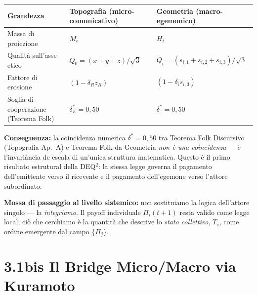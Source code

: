 {\def\LTcaptype{none} %
{\small\begin{longtable}[]{@{}
  >{\raggedright\arraybackslash}p{}
  >{\raggedright\arraybackslash}p{}
  >{\raggedright\arraybackslash}p{}@{}}
\toprule\noalign{}
\begin{minipage}[b]{\linewidth}\raggedright
Grandezza
\end{minipage} & \begin{minipage}[b]{\linewidth}\raggedright
Topografia (micro-comunicativo)
\end{minipage} & \begin{minipage}[b]{\linewidth}\raggedright
Geometria (macro-egemonico)
\end{minipage} \\
\midrule\noalign{}
\endhead
\bottomrule\noalign{}
\endlastfoot
Massa di proiezione & \(M_e\) & \(H_i\) \\
Qualità sull'asse etico & \(Q_0 = (x+y+z)/\sqrt{3}\) &
\(Q_i = (s_{i,1}+s_{i,2}+s_{i,3})/\sqrt{3}\) \\
Fattore di erosione & \((1 - \delta_R z_R)\) &
\((1 - \delta_i s_{i,3})\) \\
Soglia di cooperazione (Teorema Folk) & \(\delta^*_E = 0{,}50\) &
\(\delta^* = 0{,}50\) \\
\end{longtable}}
}

\Proved{} \textbf{Conseguenza:} la coincidenza numerica
\(\delta^* = 0{,}50\) tra Teorema Folk Discursivo (Topografia Ap.~A) e
Teorema Folk da Geometria \emph{non è una coincidenza} --- è
l'invariância de escala di un'unica struttura matematica. Questo è il
primo risultato estrutural della DEQ$^2$: la stessa legge governa il
pagamento dell'emittente verso il ricevente e il pagamento dell'egemone
verso l'attore subordinato.

\Hypoth{} \textbf{Mossa di passaggio al livello sistemico:} non
sostituiamo la logica dell'attore singolo --- la \emph{integriamo}. Il
payoff individuale \(\Pi_i(t+1)\) resta valido come legge local; ciò
che cerchiamo è la quantità che descrive lo \emph{stato collettivo},
\(T_s\), come ordine emergente dal campo \(\{\Pi_j\}\).



\section{3.1bis Il Bridge Micro/Macro via
Kuramoto}\label{bis-il-bridge-micromacro-via-kuramoto}

